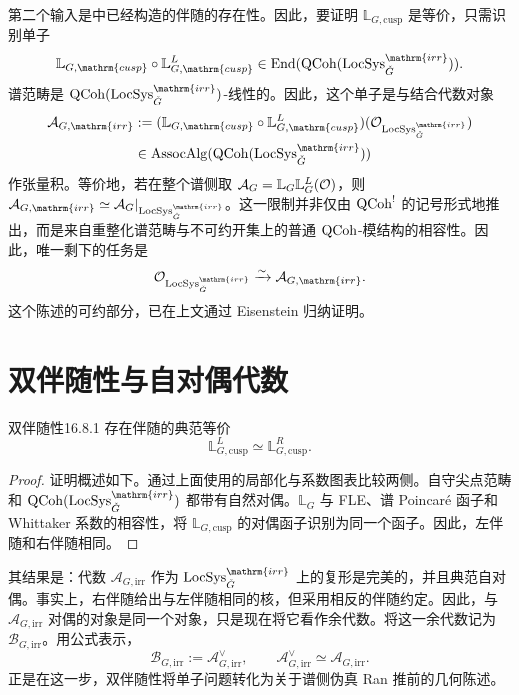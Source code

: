 第二个输入是中已经构造的伴随的存在性。因此，要证明 $\mathbb L_{G,\mathrm{cusp}}$ 是等价，只需识别单子
\[\mathbb L_{G,\mathrm{cusp}}\circ\mathbb L_{G,\mathrm{cusp}}^L\in\End(\QCoh(\LocSys^{\mathrm{irr}}_{\checkG})).\]
谱范畴是 $\QCoh(\LocSys^{\mathrm{irr}}_{\checkG})$-线性的。因此，这个单子是与结合代数对象
\[\begin{split}
\mathcal A_{G,\mathrm{irr}}&:=(\mathbb L_{G,\mathrm{cusp}}\circ\mathbb L_{G,\mathrm{cusp}}^L)(\cO_{\LocSys^{\mathrm{irr}}_{\checkG}})\\
&\in\operatorname{AssocAlg}(\QCoh(\LocSys^{\mathrm{irr}}_{\checkG}))
\end{split}\]
作张量积。等价地，若在整个谱侧取 $\mathcal A_G=\mathbb L_G\mathbb L_G^L(\mathcal{O})$，则 $\mathcal A_{G,\mathrm{irr}}\simeq\mathcal A_G|_{\LocSys^{\mathrm{irr}}_{\checkG}}$。这一限制并非仅由 $\operatorname{QCoh}^!$ 的记号形式地推出，而是来自重整化谱范畴与不可约开集上的普通 $\operatorname{QCoh}$-模结构的相容性。因此，唯一剩下的任务是
\[\cO_{\LocSys^{\mathrm{irr}}_{\checkG}}\xrightarrow{\sim}\mathcal A_{G,\mathrm{irr}}.\]
这个陈述的可约部分，已在上文通过 Eisenstein 归纳证明。

\section{双伴随性与自对偶代数}\label{sec:16.8}
\begin{theorem}{双伴随性\cite{ABC24b}}{16.8.1}
存在伴随的典范等价
\[\mathbb L_{G,\mathrm{cusp}}^L\simeq\mathbb L_{G,\mathrm{cusp}}^R.\]
\end{theorem}
\begin{proof}
证明概述如下。通过上面使用的局部化与系数图表比较两侧。自守尖点范畴和 $\QCoh(\LocSys^{\mathrm{irr}}_{\checkG})$ 都带有自然对偶。$\mathbb L_G$ 与 FLE、谱 Poincaré 函子和 Whittaker 系数的相容性，将 $\mathbb L_{G,\mathrm{cusp}}$ 的对偶函子识别为同一个函子。因此，左伴随和右伴随相同。
\end{proof}

其结果是：代数 $\mathcal A_{G,\mathrm{irr}}$ 作为 $\LocSys^{\mathrm{irr}}_{\checkG}$ 上的复形是完美的，并且典范自对偶。事实上，右伴随给出与左伴随相同的核，但采用相反的伴随约定。因此，与 $\mathcal A_{G,\mathrm{irr}}$ 对偶的对象是同一个对象，只是现在将它看作余代数。将这一余代数记为 $\mathcal B_{G,\mathrm{irr}}$。用公式表示，
\[\mathcal B_{G,\mathrm{irr}}:=\mathcal A_{G,\mathrm{irr}}^\vee,\qquad
\mathcal A_{G,\mathrm{irr}}^\vee\simeq\mathcal A_{G,\mathrm{irr}}.\]
正是在这一步，双伴随性将单子问题转化为关于谱侧伪真 Ran 推前的几何陈述。


